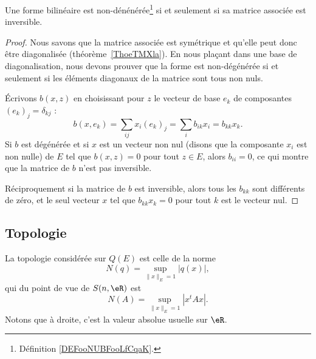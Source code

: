 \begin{proposition}     \label{PROPooQHHPooSqpgcb}
    Une forme bilinéaire est non-dénénérée\footnote{Définition \ref{DEFooNUBFooLfCqaK}.} si et seulement si sa matrice associée est inversible.
\end{proposition}

\begin{proof}
    Nous savons que la matrice associée est symétrique et qu'elle peut donc être diagonalisée (théorème~\ref{ThoeTMXla}). En nous plaçant dans une base de diagonalisation, nous devons prouver que la forme est non-dégénérée si et seulement si les éléments diagonaux de la matrice sont tous non nuls.

    Écrivons \( b(x,z)\) en choisissant pour \( z\) le vecteur de base \( e_k\) de composantes \( (e_k)_j=\delta_{kj}\) :
    \begin{equation}
            b(x,e_k)=\sum_{ij}x_i(e_k)_j
            =\sum_i b_{ik}x_i
            =b_{kk}x_k.
    \end{equation}
    Si \( b\) est dégénérée et si \( x\) est un vecteur non nul (disons que la composante \( x_i\) est non nulle) de \( E\) tel que \( b(x,z)=0\) pour tout \( z\in E\), alors \( b_{ii}=0\), ce qui montre que la matrice de \( b\) n'est pas inversible.

    Réciproquement si la matrice de \( b\) est inversible, alors tous les \( b_{kk}\) sont différents de zéro, et le seul vecteur \( x\) tel que \( b_{kk}x_k=0\) pour tout \( k\) est le vecteur nul.
\end{proof}


\subsection{Topologie}

La topologie considérée sur \( Q(E)\) est celle de la norme
\begin{equation}    \label{EqZYBooZysmVh}
    N(q)=\sup_{\| x \|_E=1}| q(x) |,
\end{equation}
qui du point de vue de \( S(n,\eR)\) est
\begin{equation}    \label{EQooJETQooIjxRWu}
    N(A)=\sup_{\| x \|_E=1}| x^tAx |.
\end{equation}
Notons que à droite, c'est la valeur absolue usuelle sur \( \eR\).

